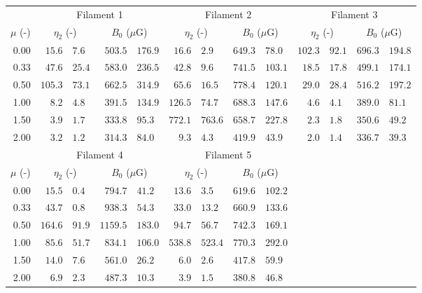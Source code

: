 \begin{tabular}{@{}rr@{ $\pm$ }lr@{ $\pm$ }lr@{ $\pm$ }lr@{ $\pm$ }lr@{ $\pm$ }lr@{ $\pm$ }l@{}}
\toprule
{} & \multicolumn{4}{c}{Filament 1}
   & \multicolumn{4}{c}{Filament 2}
   & \multicolumn{4}{c}{Filament 3} \\
\cmidrule(lr){2-5} \cmidrule(lr){6-9} \cmidrule(lr){10-13}
$\mu$ (-) & \multicolumn{2}{c}{$\eta_2$ (-)} & \multicolumn{2}{c}{$B_0$ ($\mu$G)}
          & \multicolumn{2}{c}{$\eta_2$ (-)} & \multicolumn{2}{c}{$B_0$ ($\mu$G)}
          & \multicolumn{2}{c}{$\eta_2$ (-)} & \multicolumn{2}{c}{$B_0$ ($\mu$G)} \\
\cmidrule{1-13}
0.00 & $15.6$ & $7.6$ & $503.5$ & $176.9$
     & $16.6$ & $2.9$ & $649.3$ & $78.0$
     & $102.3$ & $92.1$ & $696.3$ & $194.8$ \\
0.33 & $47.6$ & $25.4$ & $583.0$ & $236.5$
     & $42.8$ & $9.6$ & $741.5$ & $103.1$
     & $18.5$ & $17.8$ & $499.1$ & $174.1$ \\
0.50 & $105.3$ & $73.1$ & $662.5$ & $314.9$
     & $65.6$ & $16.5$ & $778.4$ & $120.1$
     & $29.0$ & $28.4$ & $516.2$ & $197.2$ \\
1.00 & $8.2$ & $4.8$ & $391.5$ & $134.9$
     & $126.5$ & $74.7$ & $688.3$ & $147.6$
     & $4.6$ & $4.1$ & $389.0$ & $81.1$ \\
1.50 & $3.9$ & $1.7$ & $333.8$ & $95.3$
     & $772.1$ & $763.6$ & $658.7$ & $227.8$
     & $2.3$ & $1.8$ & $350.6$ & $49.2$ \\
2.00 & $3.2$ & $1.2$ & $314.3$ & $84.0$
     & $9.3$ & $4.3$ & $419.9$ & $43.9$
     & $2.0$ & $1.4$ & $336.7$ & $39.3$ \\

\midrule
{} & \multicolumn{4}{c}{Filament 4}
   & \multicolumn{4}{c}{Filament 5} \\
\cmidrule(lr){2-5} \cmidrule(lr){6-9}
$\mu$ (-) & \multicolumn{2}{c}{$\eta_2$ (-)} & \multicolumn{2}{c}{$B_0$ ($\mu$G)}
          & \multicolumn{2}{c}{$\eta_2$ (-)} & \multicolumn{2}{c}{$B_0$ ($\mu$G)} \\
\cmidrule{1-9}
0.00 & $15.5$ & $0.4$ & $794.7$ & $41.2$
     & $13.6$ & $3.5$ & $619.6$ & $102.2$ \\
0.33 & $43.7$ & $0.8$ & $938.3$ & $54.3$
     & $33.0$ & $13.2$ & $660.9$ & $133.6$ \\
0.50 & $164.6$ & $91.9$ & $1159.5$ & $183.0$
     & $94.7$ & $56.7$ & $742.3$ & $169.1$ \\
1.00 & $85.6$ & $51.7$ & $834.1$ & $106.0$
     & $538.8$ & $523.4$ & $770.3$ & $292.0$ \\
1.50 & $14.0$ & $7.6$ & $561.0$ & $26.2$
     & $6.0$ & $2.6$ & $417.8$ & $59.9$ \\
2.00 & $6.9$ & $2.3$ & $487.3$ & $10.3$
     & $3.9$ & $1.5$ & $380.8$ & $46.8$ \\
\bottomrule
\end{tabular}
